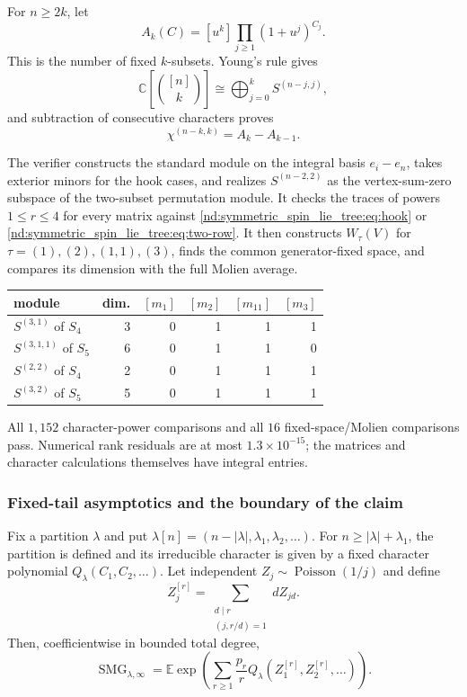 \documentclass[10pt]{article}
\newcommand{\SMG}{\operatorname{SMG}}
\newcommand{\MGF}{\SMG}
\newcommand{\C}{\mathbb C}
\newcommand{\E}{\mathbb E}
\begin{document}
For $n\ge2k$, let
\[
 A_k(C)=[u^k]\prod_{j\ge1}(1+u^j)^{C_j}.
\]
This is the number of fixed $k$-subsets.  Young's rule gives
\[
 \C\!\left[\binom{[n]}k\right]
 \cong\bigoplus_{j=0}^kS^{(n-j,j)},
\]
and subtraction of consecutive characters proves
\begin{equation}\label{nd:symmetric_spin_lie_tree:eq:two-row}
 \boxed{\chi^{(n-k,k)}=A_k-A_{k-1}.}
\end{equation}

The verifier constructs the standard module on the integral basis
$e_i-e_n$, takes exterior minors for the hook cases, and realizes
$S^{(n-2,2)}$ as the vertex-sum-zero subspace of the two-subset permutation
module.  It checks the traces of powers $1\le r\le4$ for every matrix against
\eqref{nd:symmetric_spin_lie_tree:eq:hook} or \eqref{nd:symmetric_spin_lie_tree:eq:two-row}.  It then constructs
$W_\tau(V)$ for $\tau=(1),(2),(1,1),(3)$, finds the common generator-fixed
space, and compares its dimension with the full Molien average.

\begin{center}
\begin{tabular}{@{}lrrrrr@{}}\toprule
module&dim.&$[m_1]$&$[m_2]$&$[m_{11}]$&$[m_3]$\\\midrule
$S^{(3,1)}$ of $S_4$&3&0&1&1&1\\
$S^{(3,1,1)}$ of $S_5$&6&0&1&1&0\\
$S^{(2,2)}$ of $S_4$&2&0&1&1&1\\
$S^{(3,2)}$ of $S_5$&5&0&1&1&1\\\bottomrule
\end{tabular}
\end{center}
All $1{,}152$ character-power comparisons and all $16$ fixed-space/Molien
comparisons pass.  Numerical rank residuals are at most $1.3\times10^{-15}$;
the matrices and character calculations themselves have integral entries.

\subsubsection{Fixed-tail asymptotics and the boundary of the claim}

Fix a partition $\lambda$ and put
$\lambda[n]=(n-|\lambda|,\lambda_1,\lambda_2,\ldots)$. For
$n\ge |\lambda|+\lambda_1$, the partition is defined and its irreducible
character is given by a fixed character polynomial
$Q_\lambda(C_1,C_2,\ldots)$.  Let independent
$Z_j\sim\operatorname{Poisson}(1/j)$ and define
\begin{equation}\label{nd:symmetric_spin_lie_tree:eq:poisson-power}
 Z_j^{[r]}=\sum_{\substack{d\mid r\\(j,r/d)=1}}dZ_{jd}.
\end{equation}
Then, coefficientwise in bounded total degree,
\begin{equation}\label{nd:symmetric_spin_lie_tree:eq:fixed-tail-limit}
 \boxed{
 \MGF_{\lambda,\infty}
 =\E\exp\!\left(
 \sum_{r\ge1}\frac{p_r}{r}
 Q_\lambda(Z_1^{[r]},Z_2^{[r]},\ldots)
 \right).}
\end{equation}
\end{document}
